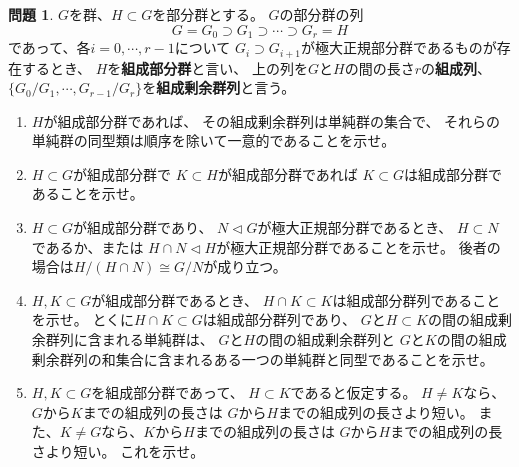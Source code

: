 \documentclass[uplatex]{jsreport}
\theoremstyle{definition}
\newtheorem{prob}[prob]{問題}
\begin{document}
\begin{prob}
  \(G\)を群、\(H\subset G\)を部分群とする。
  \(G\)の部分群の列
  \[
  G = G_0 \supset G_1 \supset \cdots \supset G_r = H
  \]
  であって、各\(i=0,\cdots,r-1\)について
  \(G_i \supset G_{i+1}\)が極大正規部分群であるものが存在するとき、
  \(H\)を\textbf{組成部分群}と言い、
  上の列を\(G\)と\(H\)の間の長さ\(r\)の\textbf{組成列}、
  \(\{G_0/G_1,\cdots,G_{r-1}/G_r\}\)を\textbf{組成剰余群列}と言う。
  \begin{enumerate}
    \item
    \(H\)が組成部分群であれば、
    その組成剰余群列は単純群の集合で、
    それらの単純群の同型類は順序を除いて一意的であることを示せ。
    \item
    \(H\subset G\)が組成部分群で
    \(K\subset H\)が組成部分群であれば
    \(K\subset G\)は組成部分群であることを示せ。
    \item
    \(H\subset G\)が組成部分群であり、
    \(N\lhd G\)が極大正規部分群であるとき、
    \(H\subset N\)であるか、または
    \(H\cap N \lhd H\)が極大正規部分群であることを示せ。
    後者の場合は\(H/(H\cap N) \cong G/N\)が成り立つ。
    \item
    \(H,K\subset G\)が組成部分群であるとき、
    \(H\cap K\subset K\)は組成部分群列であることを示せ。
    とくに\(H\cap K\subset G\)は組成部分群列であり、
    \(G\)と\(H\subset K\)の間の組成剰余群列に含まれる単純群は、
    \(G\)と\(H\)の間の組成剰余群列と
    \(G\)と\(K\)の間の組成剰余群列の和集合に含まれるある一つの単純群と同型であることを示せ。
    \item
    \(H,K\subset G\)を組成部分群であって、
    \(H\subset K\)であると仮定する。
    \(H\neq K\)なら、\(G\)から\(K\)までの組成列の長さは
    \(G\)から\(H\)までの組成列の長さより短い。
    また、\(K\neq G\)なら、\(K\)から\(H\)までの組成列の長さは
    \(G\)から\(H\)までの組成列の長さより短い。
    これを示せ。
  \end{enumerate}
\end{prob}
\end{document}

